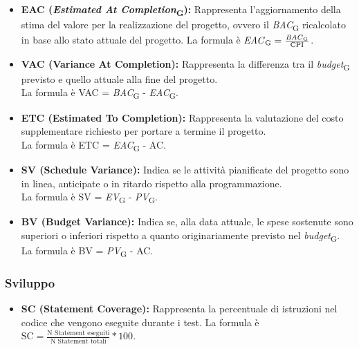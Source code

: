 \begin{itemize}
    \item \textbf{EAC (\textit{Estimated At Completion}\textsubscript{G}):} Rappresenta l'aggiornamento della stima del valore per la realizzazione del progetto, ovvero il \textit{BAC}\textsubscript{G} ricalcolato in base allo stato attuale del progetto.
    La formula è \( \text{\textit{EAC}\textsubscript{G}} = \frac{\text{\textit{BAC}\textsubscript{G}}}{\text{CPI}} \).
    \item \textbf{VAC (Variance At Completion):} Rappresenta la differenza tra il \textit{budget}\textsubscript{G} previsto e quello attuale alla fine del progetto.\\
    La formula è VAC = \textit{BAC}\textsubscript{G} - \textit{EAC}\textsubscript{G}.
    \item \textbf{ETC (Estimated To Completion):} Rappresenta la valutazione del costo supplementare richiesto per portare a termine il progetto.\\
    La formula è ETC = \textit{EAC}\textsubscript{G} - AC.
    \item \textbf{SV (Schedule Variance):} Indica se le attività pianificate del progetto sono in linea, anticipate o in ritardo rispetto alla programmazione.\\
    La formula è SV = \textit{EV}\textsubscript{G} - \textit{PV}\textsubscript{G}.
    \item \textbf{BV (Budget Variance):} Indica se, alla data attuale, le spese sostenute sono superiori o inferiori rispetto a quanto originariamente previsto nel \textit{budget}\textsubscript{G}.\\
    La formula è BV = \textit{PV}\textsubscript{G} - AC.
\end{itemize}
\newpage
\subsubsection{Sviluppo}
\begin{itemize}
    \item \textbf{SC (Statement Coverage):} Rappresenta la percentuale di istruzioni nel codice che vengono eseguite durante i test.
    La formula è \( \text{SC} = \frac{\text{N Statement eseguiti}}{\text{N Statement totali}}*100 \).
\end{itemize}
